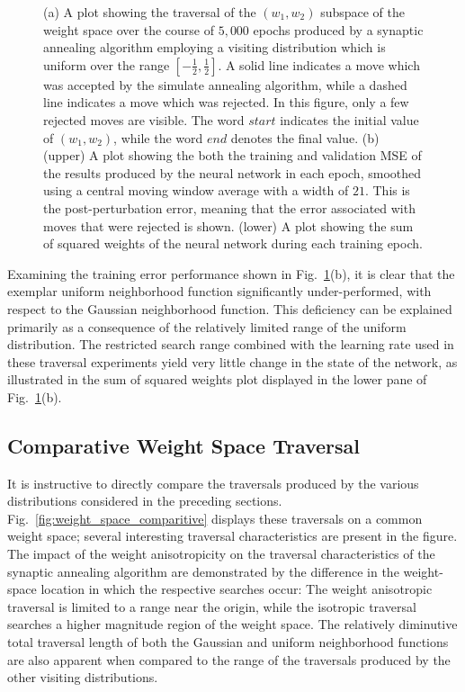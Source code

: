 \documentclass[11pt]{afthesis}
\begin{document}
\begin{figure}[ht!]
\begin{minipage}[b]{0.5\linewidth}
   		\end{minipage}
   		\caption{(a) A plot showing the traversal of the $(w_1,w_2)$ subspace of the weight space over the course of $5,000$ epochs produced by a synaptic annealing algorithm employing a visiting distribution which is uniform over the range $\left[-\frac{1}{2},\frac{1}{2}\right]$. A solid line indicates a move which was accepted by the simulate annealing algorithm, while a dashed line indicates a move which was rejected. In this figure, only a few rejected moves are visible. The word $start$ indicates the initial value of $(w_1,w_2)$, while the word $end$ denotes the final value. (b) (upper) A plot showing the both the training and validation MSE of the results produced by the neural network in each epoch, smoothed using a central moving window average with a width of $21$. This is the post-perturbation error, meaning that the error associated with moves that were rejected is shown. (lower) A plot showing the sum of squared weights of the neural network during each training epoch.}
   		\label{fig:weight_space_uniform}
   		
   		
   	\end{figure}
   	
	
	
	Examining the training error performance shown in Fig.~\ref{fig:weight_space_uniform}(b), it is clear that the exemplar uniform neighborhood function significantly under-performed, with respect to the Gaussian neighborhood function. This deficiency can be explained primarily as a consequence of the relatively limited range of the uniform distribution. The restricted search range combined with the learning rate used in these traversal experiments yield very little change in the state of the network, as illustrated in the sum of squared weights plot displayed in the lower pane of Fig.~\ref{fig:weight_space_uniform}(b).
	
	\subsection{Comparative Weight Space Traversal} 
	
	It is instructive to directly compare the traversals produced by the various distributions considered in the preceding sections. Fig.~\ref{fig:weight_space_comparitive} displays these traversals on a common weight space; several interesting traversal characteristics are present in the figure. The impact of the weight anisotropicity on the traversal characteristics of the synaptic annealing algorithm are demonstrated by the difference in the weight-space location in which the respective searches occur: The weight anisotropic traversal is limited to a range near the origin, while the isotropic traversal searches a higher magnitude region of the weight space. The relatively diminutive total traversal length of both the Gaussian and uniform neighborhood functions are also apparent when compared to the range of the traversals produced by the other visiting distributions.
	
\end{document}
